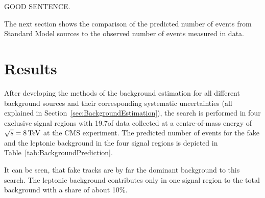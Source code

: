 GOOD SENTENCE.

The next section shows the comparison of the predicted number of events from Standard Model sources to the observed number of events measured in data.

\FloatBarrier
\chapter{Results}
\label{sec:Results}

After developing the methods of the background estimation for all different background sources and their corresponding systematic uncertainties (all explained in Section~\ref{sec:BackgroundEstimation}), 
the search is performed in four exclusive signal regions with 19.7\fbinv of data collected at a centre-of-mass energy of $\sqrt{s} = 8\,\text{Te}\kern-0.06667em\text{V}$ at the CMS experiment.
The predicted number of events for the fake and the leptonic background in the four signal regions is depicted in Table~\ref{tab:BackgroundPrediction}.
\renewcommand{\arraystretch}{1.5}
\begin{table}[!h]
\centering
\caption{Background prediction in the four exclusive signal regions for the fake and the leptonic background.}
\label{tab:BackgroundPrediction}
\end{table}
It can be seen, that fake tracks are by far the dominant background to this search.
The leptonic background contributes only in one signal region to the total background with a share of about 10\%.

